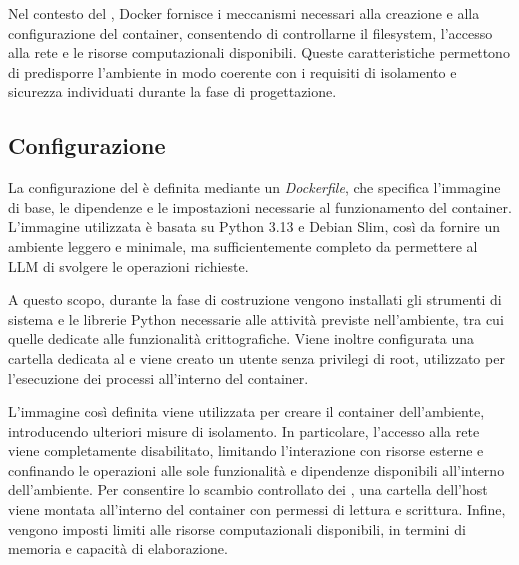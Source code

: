 Nel contesto del \sandbox{}, Docker fornisce i meccanismi necessari alla creazione e alla configurazione del container, consentendo di controllarne il filesystem, l'accesso alla rete e le risorse computazionali disponibili. Queste caratteristiche permettono di predisporre l'ambiente in modo coerente con i requisiti di isolamento e sicurezza individuati durante la fase di progettazione.

\subsection{Configurazione} %

La configurazione del \sandbox{} è definita mediante un \emph{Dockerfile}, che specifica l'immagine di base, le dipendenze e le impostazioni necessarie al funzionamento del container. L'immagine utilizzata è basata su Python 3.13 e Debian Slim, così da fornire un ambiente leggero e minimale, ma sufficientemente completo da permettere al LLM di svolgere le operazioni richieste.




A questo scopo, durante la fase di costruzione vengono installati gli strumenti di sistema e le librerie Python necessarie alle attività previste nell'ambiente, tra cui quelle dedicate alle funzionalità crittografiche. Viene inoltre configurata una cartella dedicata al \sandbox{} e viene creato un utente senza privilegi di root, utilizzato per l'esecuzione dei processi all'interno del container.



L'immagine così definita viene utilizzata per creare il container dell'ambiente, introducendo ulteriori misure di isolamento. In particolare, l'accesso alla rete viene completamente disabilitato, limitando l'interazione con risorse esterne e confinando le operazioni alle sole funzionalità e dipendenze disponibili all'interno dell'ambiente. Per consentire lo scambio controllato dei \file{}, una cartella dell'host viene montata all'interno del container con permessi di lettura e scrittura. Infine, vengono imposti limiti alle risorse computazionali disponibili, in termini di memoria e capacità di elaborazione.

